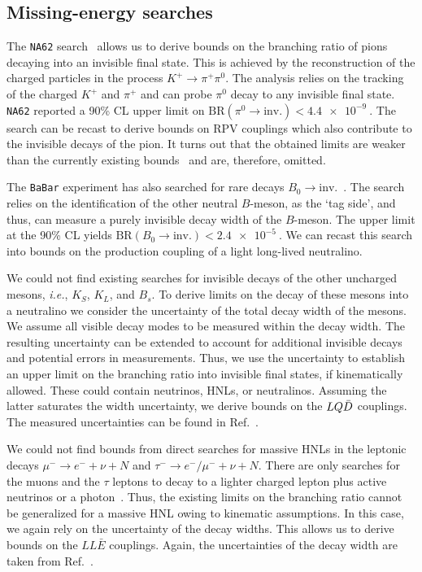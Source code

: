 \medskip


\medskip

\subsection{Missing-energy searches}

The \texttt{NA62} search~\cite{NA62:2020pwi} allows us to derive bounds on the branching ratio of pions 
decaying into an invisible final state. This is achieved by the reconstruction of the charged particles 
in the process $K^+ \to \pi^+ \pi^0$. The analysis relies on the tracking of the charged $K^+$ and $\pi
^+$ and can probe $\pi^0$ decay to any invisible final state. \texttt{NA62} 
reported a 90\% CL upper limit on $\text{BR}(\pi^0 \to \text{inv.}) < \SI{4.4e-9}
{}$. The search can be recast to derive bounds on RPV couplings which also contribute to the invisible 
decays of the pion. It turns out that the obtained limits are weaker than the currently existing bounds~\cite{Allanach:1999ic, Dercks:2017lfq} and are, therefore, omitted.

The \texttt{BaBar} experiment has also searched for rare decays $B_0 \to \text{inv.}$~\cite{BaBar:2012yut}.
The search relies on the identification of the other neutral $B$-meson, as the ‘tag side’, and thus, can 
measure a purely invisible decay width of the $B$-meson.
The upper limit at the 90\% CL yields $\text{BR}(B_0 \to \text{inv.}) < \SI{2.4e-5}{}$.
We can recast this search into bounds on the production coupling of a light long-lived neutralino.

We could not find existing searches for invisible decays of the other uncharged 
mesons, \textit{i.e.}, $K_S$, $K_L$, and $B_s$. To derive limits on the decay of these mesons into a 
neutralino we consider the uncertainty of the total decay width of the mesons. We assume all visible 
decay modes to be measured within the decay width. The resulting 
uncertainty can be extended to account for additional invisible decays and potential errors in 
measurements. Thus, we use the uncertainty to establish an upper limit on the branching ratio into 
invisible final states, if kinematically allowed. These could contain 
neutrinos, HNLs, or neutralinos. Assuming the latter saturates the width uncertainty, we derive bounds on 
the $LQ\Bar{D}$ couplings. The measured uncertainties can be found in Ref.~\cite{Workman:2022ynf}. 


We could not find bounds from direct searches for massive HNLs in the leptonic 
decays $\mu^-\to e^-+\nu  + N$ and $\tau^- \to e^-/\mu^-+ \nu + N$. There are only searches for the muons 
and the $\tau$ leptons to decay to a lighter charged lepton plus active neutrinos or a 
photon~\cite{MEG:2016leq}. Thus, the existing limits on the branching ratio cannot be generalized for a 
massive HNL owing to kinematic assumptions. In this case, we again rely on the uncertainty of the decay widths. This allows us to derive bounds on the $LL
\bar{E}$ couplings. Again, the uncertainties of the decay width are taken from 
Ref.~\cite{Workman:2022ynf}.

